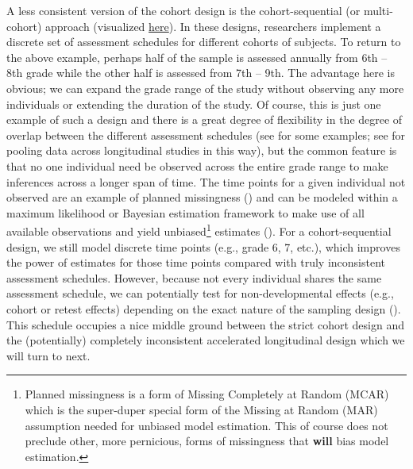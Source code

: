 \documentclass[11pt]{article}
\begin{document}
A less consistent version of the cohort design is the cohort-sequential (or multi-cohort) approach (visualized \href{https://e-m-mccormick.github.io/static/longitudinal-primer/03-time.html#multiple-cohort-data}{here}). In these designs, researchers implement a discrete set of assessment schedules for different cohorts of subjects. To return to the above example, perhaps half of the sample is assessed annually from 6th -- 8th grade while the other half is assessed from 7th -- 9th. The advantage here is obvious; we can expand the grade range of the study without observing any more individuals or extending the duration of the study. Of course, this is just one example of such a design and there is a great degree of flexibility in the degree of overlap between the different assessment schedules (see \cite{anderson_analyzing_1993,curran_disaggregation_2011,duncan_alcohol_2006,yang_life-course_2021} for some examples; see \cite{curran_pooling_2008,curran_integrative_2009} for pooling data across longitudinal studies in this way), but the common feature is that no one individual need be observed across the entire grade range to make inferences across a longer span of time. The time points for a given individual not observed are an example of planned missingness (\cite{little_joys_2014}) and can be modeled within a maximum likelihood or Bayesian estimation framework to make use of all available observations and yield unbiased\footnote{Planned missingness is a form of Missing Completely at Random (MCAR) which is the super-duper special form of the Missing at Random (MAR) assumption needed for unbiased model estimation. This of course does not preclude other, more pernicious, forms of missingness that \textbf{will} bias model estimation.} estimates (\cite{jia_planned_2014,little_planned_2013,rhemtulla_planned_2016}). For a cohort-sequential design, we still model discrete time points (e.g., grade 6, 7, etc.), which improves the power of estimates for those time points compared with truly inconsistent assessment schedules. However, because not every individual shares the same assessment schedule, we can potentially test for non-developmental effects (e.g., cohort or retest effects) depending on the exact nature of the sampling design (\cite{costa_approach_1982,ferrer_modeling_2004,mccormick_multi-level_2021,sorensen_recipe_2021}). This schedule occupies a nice middle ground between the strict cohort design and the (potentially) completely inconsistent accelerated longitudinal design which we will turn to next.
\end{document}
